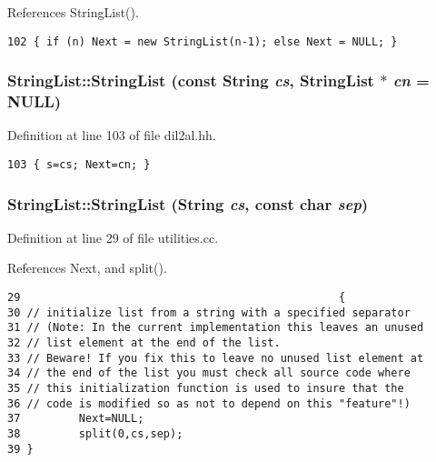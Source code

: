 References String\-List().



\footnotesize\begin{verbatim}102 { if (n) Next = new StringList(n-1); else Next = NULL; }
\end{verbatim}\normalsize 
{}
\subsubsection{\setlength{\rightskip}{0pt plus 5cm}String\-List::String\-List (const {\bf String} {\em cs}, String\-List $\ast$ {\em cn} = NULL)\hspace{0.3cm}{\tt  [inline]}}\label{classStringList_a3}




Definition at line 103 of file dil2al.hh.



\footnotesize\begin{verbatim}103 { s=cs; Next=cn; }
\end{verbatim}\normalsize 
{}
\subsubsection{\setlength{\rightskip}{0pt plus 5cm}String\-List::String\-List ({\bf String} {\em cs}, const char {\em sep})}\label{classStringList_a4}




Definition at line 29 of file utilities.cc.

References Next, and split().



\footnotesize\begin{verbatim}29                                                 {
30 // initialize list from a string with a specified separator
31 // (Note: In the current implementation this leaves an unused
32 // list element at the end of the list.
33 // Beware! If you fix this to leave no unused list element at
34 // the end of the list you must check all source code where
35 // this initialization function is used to insure that the
36 // code is modified so as not to depend on this "feature"!)
37         Next=NULL;
38         split(0,cs,sep);
39 }
\end{verbatim}\normalsize 


